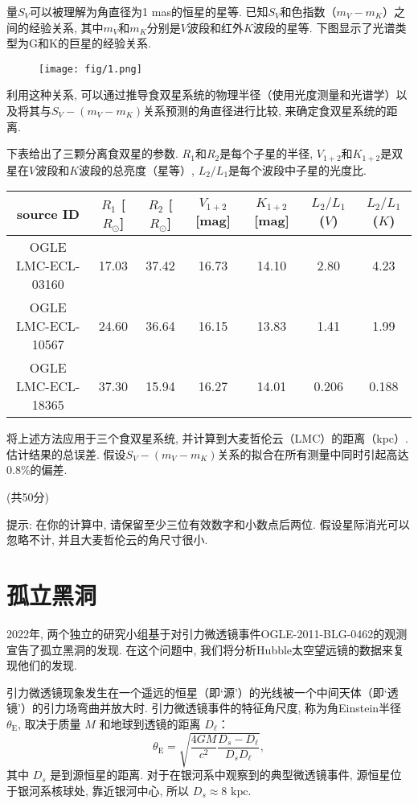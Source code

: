 \documentclass[a4paper,fontset=fandol]{ctexart}
\newcommand{\points}[1]{\par %
	\noindent %
	\hfill (#1分)%
	\vspace{1em}
}
\begin{document}
	量$S_V$可以被理解为角直径为1 mas的恒星的星等. 已知$S_V$和色指数（$m_V-m_K$）之间的经验关系, 其中$m_V$和$m_K$分别是$V$波段和红外$K$波段的星等. 下图显示了光谱类型为G和K的巨星的经验关系. 
	
	\begin{figure}[!h]
		\centering
		\texttt{[image: fig/1.png]}
	\end{figure}
	
	利用这种关系, 可以通过推导食双星系统的物理半径（使用光度测量和光谱学）以及将其与$S_V-(m_V-m_K)$关系预测的角直径进行比较, 来确定食双星系统的距离. 
	
	下表给出了三颗分离食双星的参数. $R_1$和$R_2$是每个子星的半径, $V_{1+2}$和$K_{1+2}$是双星在$V$波段和$K$波段的总亮度（星等）, $L_2/L_1$是每个波段中子星的光度比. 
	
	\begin{table}[!h]
		\centering
		\begin{tabular}{|c|c|c|c|c|c|c|}
			\hline
			\textbf{source ID}&$R_1$ [$R_\odot$]&$R_2$ [$R_\odot$]&$V_{1+2}$ [mag]&$K_{1+2}$ [mag]&$L_2/L_1$ ($V$)&$L_2/L_1$ ($K$)\\
			\hline
			OGLE LMC-ECL-03160&17.03&37.42&16.73&14.10&2.80&4.23\\
			\hline
			OGLE LMC-ECL-10567&24.60&36.64&16.15&13.83&1.41&1.99\\
			\hline
			OGLE LMC-ECL-18365&37.30&15.94&16.27&14.01&0.206&0.188\\
			\hline
		\end{tabular}
	\end{table}
	
	将上述方法应用于三个食双星系统, 并计算到大麦哲伦云（LMC）的距离（kpc）. 估计结果的总误差. 假设$S_V-(m_V-m_K)$关系的拟合在所有测量中同时引起高达0.8\%的偏差. 
	\points{共50}
	
	\vspace{-1em}
	提示: 在你的计算中, 请保留至少三位有效数字和小数点后两位. 假设星际消光可以忽略不计, 并且大麦哲伦云的角尺寸很小. 
	
	\vspace{1em}
	\section{孤立黑洞}
	
	2022年, 两个独立的研究小组基于对引力微透镜事件OGLE-2011-BLG-0462的观测宣告了孤立黑洞的发现. 在这个问题中, 我们将分析Hubble太空望远镜的数据来复现他们的发现. 
	
	引力微透镜现象发生在一个遥远的恒星（即`源'）的光线被一个中间天体（即`透镜'）的引力场弯曲并放大时. 引力微透镜事件的特征角尺度, 称为角Einstein半径 $\theta_\mathrm{E}$, 取决于质量 $M$ 和地球到透镜的距离 $D_\ell$：
	\[\theta_\mathrm{E}=\sqrt{\dfrac{4GM}{c^2}\dfrac{D_s-D_\ell}{D_sD_\ell}},\]
	其中 $D_s$ 是到源恒星的距离. 对于在银河系中观察到的典型微透镜事件, 源恒星位于银河系核球处, 靠近银河中心, 所以 $D_s\approx8\text{ kpc}$. 
	
\end{document}
